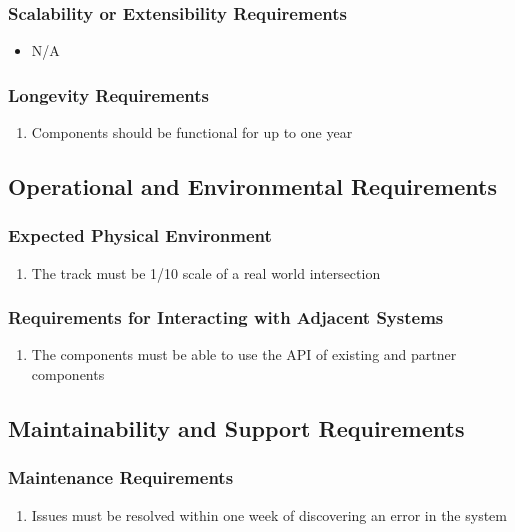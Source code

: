 \documentclass [12pt]{article}
\begin{document}
\subsubsection{Scalability or Extensibility Requirements }
	\begin{itemize}
		\item N/A
	\end{itemize}
		
\subsubsection{Longevity Requirements }
	\begin{enumerate}[label=\textbf{\Alph*}:]
		\item Components should be functional for up to one year
	\end{enumerate}

\subsection{Operational and Environmental Requirements}
\subsubsection{Expected Physical Environment }
	\begin{enumerate}[label=\textbf{\Alph*}:]
		\item The track must be 1/10 scale of a real world intersection
	\end{enumerate}
		
\subsubsection{Requirements for Interacting with Adjacent Systems}
	\begin{enumerate}[label=\textbf{\Alph*}:]
		\item The components must be able to use the API of existing and partner components
	\end{enumerate}

\subsection{Maintainability and Support Requirements }
\subsubsection{Maintenance Requirements }
	\begin{enumerate}[label=\textbf{\Alph*}:]
		\item  Issues must be resolved within one week of discovering an error in the system
	\end{enumerate}
\end{document}
